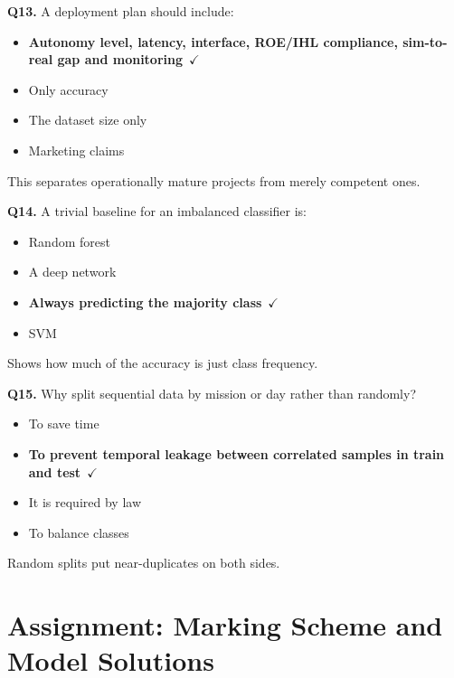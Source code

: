 \documentclass[11pt]{article}
\begin{document}
{\noindent\textbf{Q13.} A deployment plan should include:\begin{itemize}[leftmargin=2.2em,itemsep=0pt,topsep=1pt]\item[\textbf{A.}] \textbf{Autonomy level, latency, interface, ROE/IHL compliance, sim-to-real gap and monitoring}~{\color{GrnN}$\checkmark$}\item[B.] Only accuracy\item[C.] The dataset size only\item[D.] Marketing claims\end{itemize} This separates operationally mature projects from merely competent ones.\par\medskip

\noindent\textbf{Q14.} A trivial baseline for an imbalanced classifier is:\begin{itemize}[leftmargin=2.2em,itemsep=0pt,topsep=1pt]\item[A.] Random forest\item[B.] A deep network\item[\textbf{C.}] \textbf{Always predicting the majority class}~{\color{GrnN}$\checkmark$}\item[D.] SVM\end{itemize} Shows how much of the accuracy is just class frequency.\par\medskip

\noindent\textbf{Q15.} Why split sequential data by mission or day rather than randomly?\begin{itemize}[leftmargin=2.2em,itemsep=0pt,topsep=1pt]\item[A.] To save time\item[\textbf{B.}] \textbf{To prevent temporal leakage between correlated samples in train and test}~{\color{GrnN}$\checkmark$}\item[C.] It is required by law\item[D.] To balance classes\end{itemize} Random splits put near-duplicates on both sides.\par\medskip

}

\section{Assignment: Marking Scheme and Model Solutions}
\end{document}
